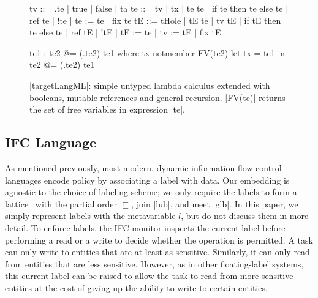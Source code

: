 \begin{figure}
\begin{code}
tv   ::= \tx.te | true | false | ta
te   ::= tv | tx | te te | if te then te else te
       | ref te | !te | te := te | fix te
tE   ::= tHole | tE te | tv tE | if tE then te else te
       | ref tE | !tE | tE := te | tv := tE | fix tE

te1 ; te2            @= (\tx.te2) te1  where  tx notmember FV(te2)
let tx = te1 in te2  @= (\tx.te2) te1
\end{code}


\caption{|targetLangML|: simple untyped lambda calculus extended with booleans,
mutable references and general recursion. |FV(te)| returns the set of free
variables in expression |te|.}
\label{fig:ml}
\end{figure}

\subsection{IFC Language}

As mentioned previously, most modern, dynamic information flow control
languages encode policy by associating a label with data.  Our
embedding is agnostic to the choice of labeling scheme; we only require
the labels to form a lattice~\cite{Denning:1976:LMS:360051.360056} with
the partial order $\sqsubseteq$, join |lub|, and meet |glb|.  In this
paper, we simply represent labels with the metavariable $l$, but do not
discuss them in more detail.
%
To enforce labels, the IFC monitor inspects the
current label  before performing a read or a write to decide whether the operation is permitted.
%
A task can only write to entities that are at least as sensitive.
%
Similarly, it can only read from entities that are less sensitive.
%
However, as in other floating-label systems, this current label can be raised
to allow the task to read from more sensitive entities at the cost of giving up
the ability to write to certain entities.

